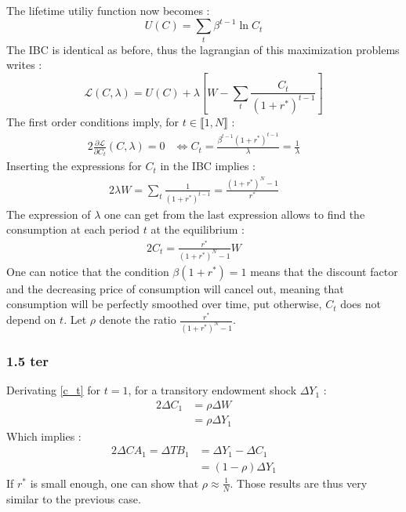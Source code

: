 \documentclass{article}
\begin{document}
\subsection{}
The lifetime utiliy function now becomes :
\begin{equation}
    U(C) = \sum_t \beta^{t-1} \ln C_t
\end{equation}
The IBC is identical as before, thus the lagrangian of this maximization problems writes :
\begin{equation}
    \mathcal{L}(C,\lambda) = U(C) + \lambda \left[ W - \sum_t \frac{C_t}{(1+r^*)^{t-1}} \right]
\end{equation}
The first order conditions imply, for $t \in \llbracket 1, N \rrbracket$ :
\begin{alignat*}{2}
    \frac{\partial\mathcal{L}}{\partial C_t} (C,\lambda) = 0 &\iff C_t = \frac{\beta^{t-1}(1+r^*)^{t-1}}{\lambda} = \frac{1}{\lambda}  \quad&
\end{alignat*}
Inserting the expressions for $C_t$ in the IBC implies :
\begin{alignat}{2}
    \lambda W = \sum_t \frac{1}{(1+r^*)^{t-1}} = \frac{(1+r^*)^N-1}{r^*}  \quad&
\end{alignat}
The expression of $\lambda$ one can get from the last expression allows to find the consumption at each period $t$ at the equilibrium :
\begin{alignat}{2}
    C_t =   \frac{r^*}{(1+r^*)^N-1} W \quad&
    \label{c_t}
\end{alignat}
One can notice that the condition $\beta(1+r^*) = 1$ means that the discount factor and the decreasing price of consumption will cancel out, meaning that consumption will be perfectly smoothed over time, put otherwise, $C_t$ does not depend on $t$.\newline
Let $\rho$ denote the ratio $\displaystyle \frac{r^*}{(1+r^*)^N-1}$.
\subsubsection*{1.5 ter} 
Derivating \eqref{c_t} for $t=1$, for a transitory endowment shock $\Delta Y_1$ :
\begin{alignat*}{2}
    \Delta C_1 &=   \rho \Delta W \quad&\\
    &=   \rho \Delta Y_1 \quad&
\end{alignat*}
Which implies :
\begin{alignat*}{2}
    \Delta CA_1 = \Delta TB_1 &= \Delta Y_1 - \Delta C_1 \quad&\\
    &=   (1 - \rho) \Delta Y_1 \quad&
\end{alignat*}
If $r^*$ is small enough, one can show that $\rho \approx \frac{1}{N}$. Those results are thus very similar to the previous case.
\end{document}
